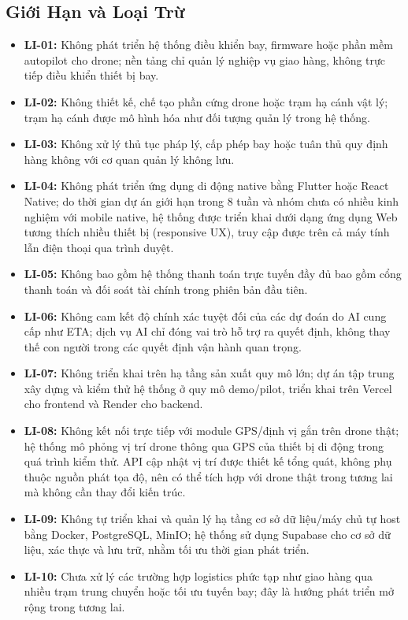 \subsection{Giới Hạn và Loại Trừ}

\begin{itemize}
  \item \textbf{LI-01:} Không phát triển hệ thống điều khiển bay, firmware hoặc phần mềm autopilot cho drone; nền tảng chỉ quản lý nghiệp vụ giao hàng, không trực tiếp điều khiển thiết bị bay.
  \item \textbf{LI-02:} Không thiết kế, chế tạo phần cứng drone hoặc trạm hạ cánh vật lý; trạm hạ cánh được mô hình hóa như đối tượng quản lý trong hệ thống.
  \item \textbf{LI-03:} Không xử lý thủ tục pháp lý, cấp phép bay hoặc tuân thủ quy định hàng không với cơ quan quản lý không lưu.
  \item \textbf{LI-04:} Không phát triển ứng dụng di động native bằng Flutter hoặc React Native; do thời gian dự án giới hạn trong 8 tuần và nhóm chưa có nhiều kinh nghiệm với mobile native, hệ thống được triển khai dưới dạng ứng dụng Web tương thích nhiều thiết bị (responsive UX), truy cập được trên cả máy tính lẫn điện thoại qua trình duyệt.
  \item \textbf{LI-05:} Không bao gồm hệ thống thanh toán trực tuyến đầy đủ bao gồm cổng thanh toán và đối soát tài chính trong phiên bản đầu tiên.
  \item \textbf{LI-06:} Không cam kết độ chính xác tuyệt đối của các dự đoán do AI cung cấp như ETA; dịch vụ AI chỉ đóng vai trò hỗ trợ ra quyết định, không thay thế con người trong các quyết định vận hành quan trọng.
  \item \textbf{LI-07:} Không triển khai trên hạ tầng sản xuất quy mô lớn; dự án tập trung xây dựng và kiểm thử hệ thống ở quy mô demo/pilot, triển khai trên Vercel cho frontend và Render cho backend.
  \item \textbf{LI-08:} Không kết nối trực tiếp với module GPS/định vị gắn trên drone thật; hệ thống mô phỏng vị trí drone thông qua GPS của thiết bị di động trong quá trình kiểm thử. API cập nhật vị trí được thiết kế tổng quát, không phụ thuộc nguồn phát tọa độ, nên có thể tích hợp với drone thật trong tương lai mà không cần thay đổi kiến trúc.
  \item \textbf{LI-09:} Không tự triển khai và quản lý hạ tầng cơ sở dữ liệu/máy chủ tự host bằng Docker, PostgreSQL, MinIO; hệ thống sử dụng Supabase cho cơ sở dữ liệu, xác thực và lưu trữ, nhằm tối ưu thời gian phát triển.
  \item \textbf{LI-10:} Chưa xử lý các trường hợp logistics phức tạp như giao hàng qua nhiều trạm trung chuyển hoặc tối ưu tuyến bay; đây là hướng phát triển mở rộng trong tương lai.
\end{itemize}